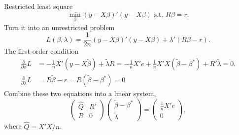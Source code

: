 \documentclass[11pt]{article}
\renewcommand{\hat}{\widehat}
\begin{document}
Restricted least square
\[\min_{\beta}\left(y-X\beta\right)'\left(y-X\beta\right)\mbox{ s.t. }R\beta=r.\]
Turn it into an unrestricted problem
\[L\left(\beta,\lambda\right)=\frac{1}{2n}\left(y-X\beta\right)'\left(y-X\beta\right)+\lambda'\left(R\beta-r\right).\]
The first-order condition 
\begin{align*}
\frac{\partial}{\partial\beta}L & =  -\frac{1}{n}X'\left(y-X\tilde{\beta}\right)+\tilde{\lambda}R=-\frac{1}{n}X'e+\frac{1}{n}X'X\left(\tilde{\beta}-\beta^{*}\right)+R'\tilde{\lambda}=0.\\
\frac{\partial}{\partial\lambda}L & =  R\tilde{\beta}-r=R\left(\tilde{\beta}-\beta^{*}\right)=0
\end{align*}
Combine these two equations into a linear system,
\[
\begin{pmatrix}
\widehat{Q} & R'\\
R & 0
\end{pmatrix}\begin{pmatrix}\tilde{\beta}-\beta^{*}\\
\tilde{\lambda}
\end{pmatrix}=\begin{pmatrix}\frac{1}{n}X'e\\
0
\end{pmatrix},\]
where $\hat{Q} = X'X/n$.
\end{document}
